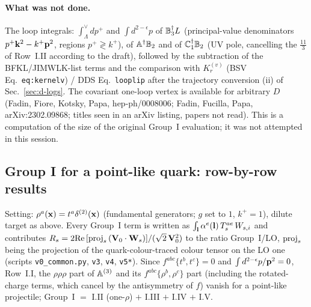 \paragraph{What was not done.} The loop integrals: $\int_\Lambda^\vee dp^+$ and $\int d^{2-\epsilon}p$ of $\mathbb{B}_3^\dagger L$ (principal-value denominators $p^+\mathbf{k}^2-k^+\mathbf{p}^2$, regions $p^+\gtrless k^+$), of $\mathbb{A}^\dagger\mathbb{B}_2$ and of $\mathbb{C}^\dagger_1\mathbb{B}_2$ (UV pole, cancelling the $\frac{11}{3}$ of Row~I.II according to the draft), followed by the subtraction of the BFKL/JIMWLK-list terms and the comparison with $K^{(v)}_r$ (BSV Eq.~\texttt{eq:kernelv}) / DDS Eq.~\texttt{looplip} after the trajectory conversion (ii) of Sec.~\ref{sec:d-logs}. The covariant one-loop vertex is available for arbitrary $D$ (Fadin, Fiore, Kotsky, Papa, hep-ph/0008006; Fadin, Fucilla, Papa, arXiv:2302.09868; titles seen in an arXiv listing, papers not read). This is a computation of the size of the original Group~I evaluation; it was not attempted in this session.

\subsection{Group I for a point-like quark: row-by-row results}\label{sec:d-quark}
Setting: $\rho^a(\mathbf{x})=t^a\delta^{(2)}(\mathbf{x})$ (fundamental generators; $g$ set to $1$, $k^+=1$), dilute target as above. Every Group~I term is written as $\int_{\mathbf{l}}\alpha^e(\mathbf{l})\,T^{ae}_s\,W_{s,i}$ and contributes $R_s=2{\rm Re}\,[{\rm proj}_s\,(\mathbf{V}_0\cdot\mathbf{W}_s)]/(\sqrt2\,\mathbf{V}_0^2)$ to the ratio Group~I/LO, ${\rm proj}_s$ being the projection of the quark-colour-traced colour tensor on the LO one (scripts \texttt{v0\_common.py}, \texttt{v3}, \texttt{v4}, \texttt{v5*}). Since $f^{abc}\{t^b,t^c\}=0$ and $\int d^{2-\epsilon}p/\mathbf{p}^2=0$, Row~I.I, the $\rho\rho\rho$ part of $\mathbb{A}^{(3)}$ and its $f^{abc}\{\rho^b,\rho^c\}$ part (including the rotated-charge terms, which cancel by the antisymmetry of $f$) vanish for a point-like projectile; Group~I $=$ I.II (one-$\rho$) $+$ I.III $+$ I.IV $+$ I.V.

